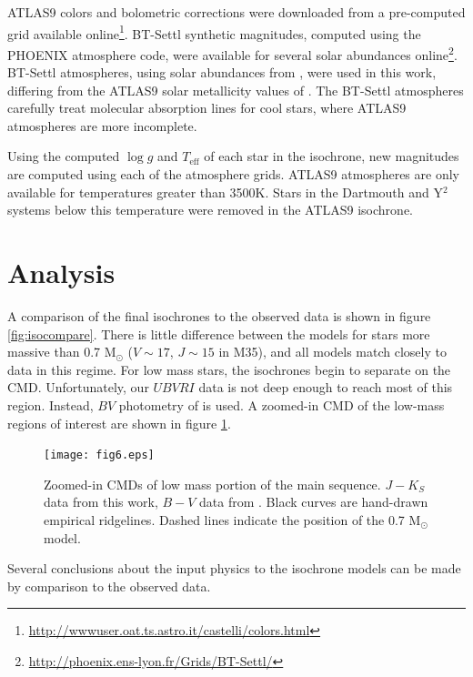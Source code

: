\documentclass[iop]{emulateapj}
\begin{document}
ATLAS9 colors and bolometric corrections were downloaded from a pre-computed grid available online\footnote{\url{http://wwwuser.oat.ts.astro.it/castelli/colors.html}}. BT-Settl synthetic magnitudes, computed using the PHOENIX atmosphere code, were available for several solar abundances online\footnote{\url{http://phoenix.ens-lyon.fr/Grids/BT-Settl/}}. BT-Settl atmospheres, using solar abundances from \citet{2009ARA&A..47..481A}, were used in this work, differing from the ATLAS9 solar metallicity values of \citet{1998SSRv...85..161G}. The BT-Settl atmospheres carefully treat molecular absorption lines for cool stars, where ATLAS9 atmospheres are more incomplete.

Using the computed $\log g$ and $T_{\text{eff}}$ of each star in the isochrone, new magnitudes are computed using each of the atmosphere grids. ATLAS9 atmospheres are only available for temperatures greater than 3500K. Stars in the Dartmouth and Y$^2$ systems below this temperature were removed in the ATLAS9 isochrone.




\section{Analysis}

A comparison of the final isochrones to the observed data is shown in figure \ref{fig:isocompare}. There is little difference between the models for stars more massive than 0.7 M$_\odot$ ($V \sim 17$, $J \sim 15$ in M35), and all models match closely to data in this regime. For low mass stars, the isochrones begin to separate on the CMD. Unfortunately, our $UBVRI$ data is not deep enough to reach most of this region. Instead, $BV$ photometry of \citet{2003AJ....126.1402K} is used. A zoomed-in CMD of the low-mass regions of interest are shown in figure \ref{fig:isocompare-zoomed}.

\begin{figure} \centering
\texttt{[image: fig6.eps]}		%
\caption{Zoomed-in CMDs of low mass portion of the main sequence. $J-K_S$ data from this work, $B-V$ data from \citet{2003AJ....126.1402K}. Black curves are hand-drawn empirical ridgelines. Dashed lines indicate the position of the 0.7 M$_\odot$ model. \label{fig:isocompare-zoomed}}
\end{figure}

Several conclusions about the input physics to the isochrone models can be made by comparison to the observed data.
\end{document}

